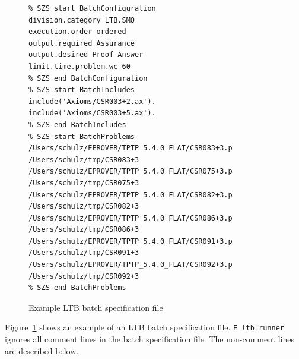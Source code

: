 \documentclass{report}
\begin{document}
\begin{figure}
  \footnotesize
  \centering
  \begin{verbatim}
% SZS start BatchConfiguration
division.category LTB.SMO
execution.order ordered
output.required Assurance
output.desired Proof Answer
limit.time.problem.wc 60
% SZS end BatchConfiguration
% SZS start BatchIncludes
include('Axioms/CSR003+2.ax').
include('Axioms/CSR003+5.ax').
% SZS end BatchIncludes
% SZS start BatchProblems
/Users/schulz/EPROVER/TPTP_5.4.0_FLAT/CSR083+3.p /Users/schulz/tmp/CSR083+3
/Users/schulz/EPROVER/TPTP_5.4.0_FLAT/CSR075+3.p /Users/schulz/tmp/CSR075+3
/Users/schulz/EPROVER/TPTP_5.4.0_FLAT/CSR082+3.p /Users/schulz/tmp/CSR082+3
/Users/schulz/EPROVER/TPTP_5.4.0_FLAT/CSR086+3.p /Users/schulz/tmp/CSR086+3
/Users/schulz/EPROVER/TPTP_5.4.0_FLAT/CSR091+3.p /Users/schulz/tmp/CSR091+3
/Users/schulz/EPROVER/TPTP_5.4.0_FLAT/CSR092+3.p /Users/schulz/tmp/CSR092+3
% SZS end BatchProblems
\end{verbatim}
  \caption{Example LTB batch specification file}
  \label{fig:ltbspec}
\end{figure}

Figure~\ref{fig:ltbspec} shows an example of an LTB batch
specification file. \texttt{E\_ltb\_runner} ignores all comment lines
in the batch specification file. The non-comment lines are described
below.
\end{document}
